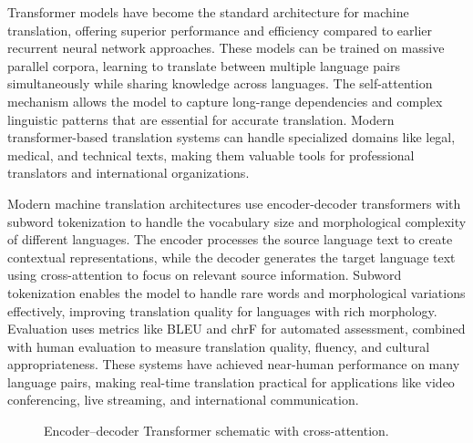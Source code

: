 Transformer models have become the standard architecture for machine translation, offering superior performance and efficiency compared to earlier recurrent neural network approaches. These models can be trained on massive parallel corpora, learning to translate between multiple language pairs simultaneously while sharing knowledge across languages. The self-attention mechanism allows the model to capture long-range dependencies and complex linguistic patterns that are essential for accurate translation. Modern transformer-based translation systems can handle specialized domains like legal, medical, and technical texts, making them valuable tools for professional translators and international organizations.

Modern machine translation architectures use encoder-decoder transformers with subword tokenization to handle the vocabulary size and morphological complexity of different languages. The encoder processes the source language text to create contextual representations, while the decoder generates the target language text using cross-attention to focus on relevant source information. Subword tokenization enables the model to handle rare words and morphological variations effectively, improving translation quality for languages with rich morphology. Evaluation uses metrics like BLEU and chrF for automated assessment, combined with human evaluation to measure translation quality, fluency, and cultural appropriateness. These systems have achieved near-human performance on many language pairs, making real-time translation practical for applications like video conferencing, live streaming, and international communication.

\begin{figure}[h]
  \centering
  \caption{Encoder–decoder Transformer schematic with cross-attention.}
  \label{fig:mt-transformer}
\end{figure}

